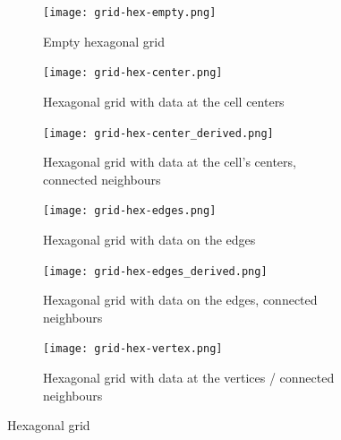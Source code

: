 \documentclass{../../template/esiwace-report}
\begin{document}
\begin{figure}[!tbp]
 \centering
  \begin{subfigure}[b]{0.4\textwidth}
	 \texttt{[image: grid-hex-empty.png]}
	 \caption{Empty hexagonal grid}
	 \label{fig:grid-hex-empty}
 \end{subfigure}
 \hfill
 \begin{subfigure}[b]{0.4\textwidth}
	 \texttt{[image: grid-hex-center.png]}
	 \caption{Hexagonal grid with data at the cell centers}
	 \label{fig:grid-hex-center}
 \end{subfigure}
 \hfill
 \begin{subfigure}[b]{0.4\textwidth}
	 \texttt{[image: grid-hex-center\_derived.png]}
	 \caption{Hexagonal grid with data at the cell's centers, connected neighbours}
	 \label{fig:grid-hex-center_derived}
 \end{subfigure}
 \hfill
 \begin{subfigure}[b]{0.4\textwidth}
	 \texttt{[image: grid-hex-edges.png]}
	 \caption{Hexagonal grid with data on the edges}
	 \label{fig:grid-hex-edges}
 \end{subfigure}
 \hfill
 \begin{subfigure}[b]{0.4\textwidth}
	 \texttt{[image: grid-hex-edges\_derived.png]}
	 \caption{Hexagonal grid with data on the edges, connected neighbours}
	 \label{fig:grid-hex-edges_derived}
 \end{subfigure}
 \hfill
 \begin{subfigure}[b]{0.4\textwidth}
	 \texttt{[image: grid-hex-vertex.png]}
	 \caption{Hexagonal grid with data at the vertices / connected neighbours}
	 \label{fig:grid-hex-vertex}
 \end{subfigure}

 \caption{Hexagonal grid}
 \label{fig:hexagonalgrid}
\end{figure}
\end{document}
